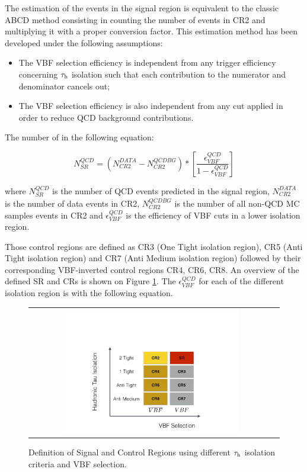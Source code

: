 The estimation of the events in the signal region is equivalent to the classic ABCD method consisting in counting the number of events in CR2 and multiplying it with a proper conversion factor. This estimation method has been developed under the following assumptions:

\begin{itemize}
	\item[1] The VBF selection efficiency is independent from any trigger efficiency concerning $\tau_{\text{h}}$ isolation such that each contribution to the numerator and denominator cancels out;
	\item[2] The VBF selection efficiency is also independent from any \met cut applied in order to reduce QCD background contributions. 
\end{itemize}

 The number of   in the following equation:

\begin{equation}
N^{QCD}_{SR} = \left( N^{DATA}_{CR2} - N^{\overline{QCD} BG}_{CR2} \right) * \left[ \frac{\epsilon^{QCD}_{VBF}}{1 - \epsilon^{QCD}_{VBF}} \right]
\label{eq:qcdbgpred}
\end{equation}

where $N^{QCD}_{SR}$ is the number of QCD events predicted in the signal region, $N^{DATA}_{CR2}$ is the number of data events in CR2, $N^{\overline{QCD} BG}_{CR2}$ is the number of all non-QCD MC samples events in CR2 and $\epsilon^{QCD}_{VBF}$ is the efficiency of VBF cuts in a lower \hadtau isolation region. 

Those  control regions are defined as CR3 (One Tight isolation region), CR5  (Anti Tight isolation region) and CR7 (Anti Medium isolation region) followed by their corresponding VBF-inverted control regions CR4, CR6, CR8. An overview of the defined SR and CRs is shown on Figure \ref{fig:crs}. The $\epsilon^{QCD}_{VBF}$ for each of the different \hadtau isolation region is with the following equation.

\begin{figure}[tbh!]
	\centering
	\begin{tabular}{cc}
		\includegraphics[width=0.75\textwidth]{PLOTS/diTauHadLSotherPlots/controlregions.pdf}
	\end{tabular}
	\caption{Definition of Signal and Control Regions using different $\tau_{\text{h}}$ isolation criteria and VBF selection.}
	\label{fig:crs}
\end{figure}

